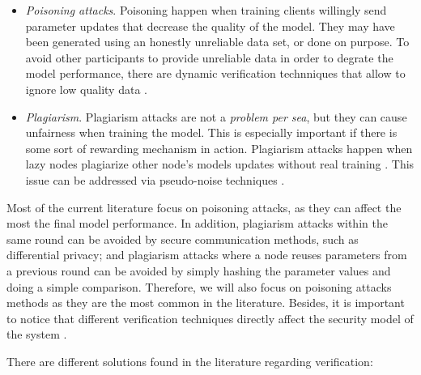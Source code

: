 \begin{itemize}
    \item \textit{Poisoning attacks}. Poisoning happen when training clients willingly send parameter updates that decrease the quality of the model. They may have been generated using an honestly unreliable data set, or done on purpose. To avoid other participants to provide unreliable data in order to degrate the model performance, there are dynamic verification technniques that allow to ignore low quality data \cite{10.48550/arxiv.2110.02182, 10.48550/arxiv.2104.10501}.
    
    \item \textit{Plagiarism}. Plagiarism attacks are not a \textit{problem per sea}, but they can cause unfairness when training the model. This is especially important if there is some sort of rewarding mechanism in action. Plagiarism attacks happen when lazy nodes plagiarize other node's models updates without real training \cite{9403374}. This issue can be addressed via pseudo-noise techniques \cite{10.48550/arxiv.2009.09338}.
\end{itemize}

Most of the current literature focus on poisoning attacks, as they can affect the most the final model performance. In addition, plagiarism attacks within the same round can be avoided by secure communication methods, such as differential privacy; and plagiarism attacks where a node reuses parameters from a previous round can be avoided by simply hashing the parameter values and doing a simple comparison. Therefore, we will also focus on poisoning attacks methods as they are the most common in the literature. Besides, it is important to notice that different verification techniques directly affect the security model of the system \cite{10.48550/arxiv.2110.02182}.

There are different solutions found in the literature regarding verification:

